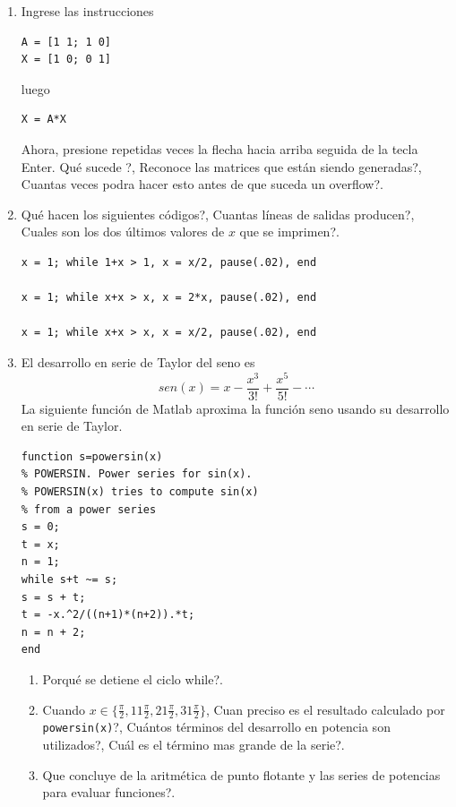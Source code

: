 \documentclass[12pt,letterpaper]{article}
\begin{document}
\begin{enumerate}
\item Ingrese las instrucciones 
\begin{verbatim}
A = [1 1; 1 0]
X = [1 0; 0 1]
\end{verbatim}
luego 
\begin{verbatim}
X = A*X
\end{verbatim}
Ahora, presione repetidas veces la flecha hacia arriba seguida de la tecla Enter. \textquestiondown Qu\'e sucede ?, \textquestiondown Reconoce 
las matrices que est\'an siendo generadas?, \textquestiondown Cuantas veces podra hacer esto antes de que suceda un overflow?.

\item \textquestiondown Qu\'e hacen los siguientes c\'odigos?, \textquestiondown Cuantas l\'ineas de salidas producen?, \textquestiondown Cuales son los dos \'ultimos valores de $x$ que se imprimen?.

\begin{verbatim}
x = 1; while 1+x > 1, x = x/2, pause(.02), end

x = 1; while x+x > x, x = 2*x, pause(.02), end

x = 1; while x+x > x, x = x/2, pause(.02), end
\end{verbatim}

\item El desarrollo en serie de Taylor del seno es 
$$sen(x) = x-\frac{x^3}{3!}+\frac{x^5 }{5!}- \cdots$$
La siguiente funci\'on de Matlab aproxima la funci\'on seno 
usando su desarrollo en serie de Taylor.
\begin{verbatim}
function s=powersin(x)
% POWERSIN. Power series for sin(x).
% POWERSIN(x) tries to compute sin(x)
% from a power series
s = 0;
t = x;
n = 1;
while s+t ~= s;
s = s + t;
t = -x.^2/((n+1)*(n+2)).*t;
n = n + 2;
end
\end{verbatim}
\begin{enumerate}
\item \textquestiondown Porqu\'e se detiene el ciclo while?.
\item Cuando $x\in\{\frac{\pi}{2}, 11\frac{\pi}{2}, 21\frac{\pi}{2}, 31\frac{\pi}{2}\}$, 
\textquestiondown Cuan preciso es el resultado calculado por \texttt{powersin(x)}?, \textquestiondown Cu\'antos t\'erminos del desarrollo en potencia son utilizados?, \textquestiondown Cu\'al es el t\'ermino mas grande de la serie?.
\item \textquestiondown Que concluye de la aritm\'etica de punto flotante y las series de potencias para evaluar funciones?.
\end{enumerate}


\end{enumerate}
\end{document}
